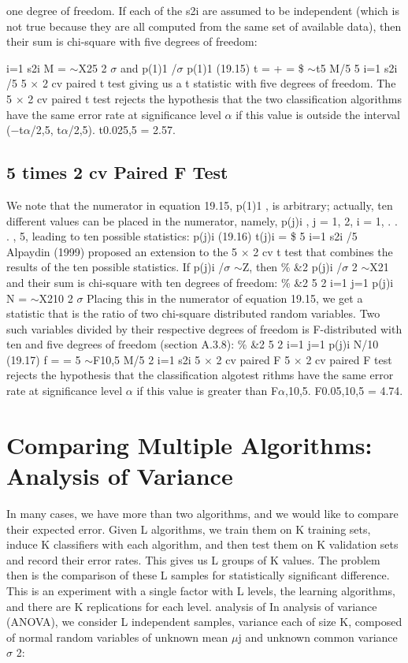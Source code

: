 one degree of freedom. If each of the s2i are assumed to be independent (which is not true because they are all computed from the same set of available data), then their sum is chi-square with five degrees of freedom:

i=1 s2i M = $\sim$X25 2 $\sigma$ and p(1)1 /$\sigma$ p(1)1 (19.15) t = + = \$ $\sim$t5 M/5 5 i=1 s2i /5 5 $\times$ 2 cv paired t test giving us a t statistic with five degrees of freedom. The 5 $\times$ 2 cv paired t test rejects the hypothesis that the two classification algorithms have the same error rate at significance level $\alpha$ if this value is outside the interval ($-$t$\alpha$/2,5, t$\alpha$/2,5). t0.025,5 = 2.57.

\subsection{5 times 2 cv Paired F Test}

We note that the numerator in equation 19.15, p(1)1 , is arbitrary; actually, ten different values can be placed in the numerator, namely, p(j)i , j = 1, 2, i = 1, . . . , 5, leading to ten possible statistics: p(j)i (19.16) t(j)i = \$ 5 i=1 s2i /5 Alpaydin (1999) proposed an extension to the 5 $\times$ 2 cv t test that combines the results of the ten possible statistics. If p(j)i /$\sigma$ $\sim$Z, then \% \&2 p(j)i /$\sigma$ 2 $\sim$X21 and their sum is chi-square with ten degrees of freedom: \% \&2 5 2 i=1 j=1 p(j)i N = $\sim$X210 2 $\sigma$ Placing this in the numerator of equation 19.15, we get a statistic that is the ratio of two chi-square distributed random variables. Two such variables divided by their respective degrees of freedom is F-distributed with ten and five degrees of freedom (section A.3.8): \% \&2 5 2 i=1 j=1 p(j)i N/10 (19.17) f = = 5 $\sim$F10,5 M/5 2 i=1 s2i 5 $\times$ 2 cv paired F 5 $\times$ 2 cv paired F test rejects the hypothesis that the classification algotest rithms have the same error rate at significance level $\alpha$ if this value is greater than F$\alpha$,10,5. F0.05,10,5 = 4.74.

\section{Comparing Multiple Algorithms: Analysis of Variance}

In many cases, we have more than two algorithms, and we would like to compare their expected error. Given L algorithms, we train them on K training sets, induce K classifiers with each algorithm, and then test them on K validation sets and record their error rates. This gives us L groups of K values. The problem then is the comparison of these L samples for statistically significant difference. This is an experiment with a single factor with L levels, the learning algorithms, and there are K replications for each level. analysis of In analysis of variance (ANOVA), we consider L independent samples, variance each of size K, composed of normal random variables of unknown mean $\mu$j and unknown common variance $\sigma$ 2:


